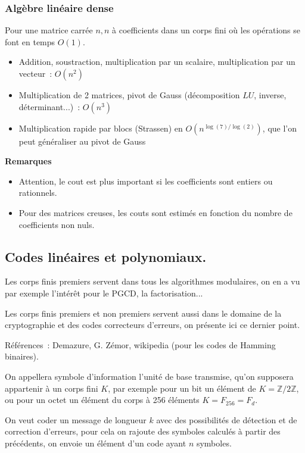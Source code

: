 \documentclass[a4paper,11pt]{article}
\begin{document}
\begin{giacjshere}
\subsubsection{Alg\`ebre lin\'eaire dense}
Pour une matrice carr\'ee $n,n$ \`a coefficients dans un corps fini o\`u
les op\'erations se font en temps $O(1)$.
\begin{itemize}
\item Addition, soustraction, multiplication par un scalaire,
multiplication par un vecteur~: $O(n^2)$
\item Multiplication de 2 matrices, pivot de Gauss
(d\'ecomposition $LU$, inverse, d\'eterminant...)~: $O(n^3)$
\item Multiplication rapide par blocs (Strassen) en $O(n^{\log(7)/\log(2)})$,
que l'on peut g\'en\'eraliser au pivot de Gauss
\end{itemize}

{\bf Remarques}
\begin{itemize}
\item Attention, le cout est plus important si les coefficients sont entiers
ou rationnels.
\item Pour des matrices creuses, les couts sont estim\'es en fonction du nombre
de coefficients non nuls.
\end{itemize}

\pagebreak

\subsection{Codes lin\'eaires et polynomiaux.}
 
Les corps finis premiers servent dans tous les algorithmes modulaires,
on en a vu par exemple l'int\'er\^et pour le PGCD, la factorisation...

Les corps finis premiers et non premiers servent aussi dans le
domaine de la cryptographie et des codes correcteurs d'erreurs, 
on pr\'esente ici ce dernier point.

R\'ef\'erences~: Demazure, G. Z\'emor, wikipedia (pour les codes de
Hamming binaires).
 
On appellera symbole d'information l'unit\'e de base transmise, qu'on
supposera appartenir à un corps fini $K$, par
exemple pour un bit un élément de $K=\mathbb{Z}/2\mathbb{Z}$, ou pour un octet 
un \'el\'ement du corps à 256 éléments $K=F_{256}=F_d$.

On veut coder un message de longueur $k$ avec des possibilit\'es
de d\'etection et de correction d'erreurs, pour cela on rajoute
des symboles calcul\'es \`a partir des pr\'ec\'edents, 
on envoie un \'el\'ement d'un code ayant $n$ symboles.


\end{giacjshere}
\end{document}
